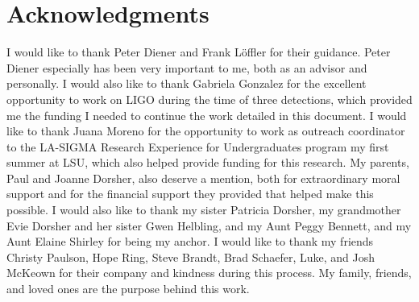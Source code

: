 \documentclass[12pt,letterpaper]{lsuetd}
\begin{document}

\chapter*{Acknowledgments}
\doublespacing
\vspace{0.55ex}
I would like to thank Peter Diener and Frank L\"{o}ffler for their guidance. Peter Diener especially has been very important to me, both as an advisor and personally. I would also like to thank Gabriela Gonzalez for the excellent opportunity to work on LIGO during the time of three detections, which provided me the funding I needed to continue the work detailed in this document. I would like to thank Juana Moreno for the opportunity to work as outreach coordinator to the LA-SIGMA Research Experience for Undergraduates program my first summer at LSU, which also helped provide funding for this research. My parents, Paul and Joanne Dorsher, also deserve a mention, both for extraordinary moral support and for the financial support they provided that helped make this possible. I would also like to thank my sister Patricia Dorsher, my grandmother Evie Dorsher and her sister Gwen Helbling, and my Aunt Peggy Bennett, and my Aunt Elaine Shirley for being my anchor. I would like to thank my friends Christy Paulson, Hope Ring, Steve Brandt, Brad Schaefer, Luke, and Josh McKeown for their company and kindness during this process. My family, friends, and loved ones are the purpose behind this work. 

\pagebreak

\end{document}
